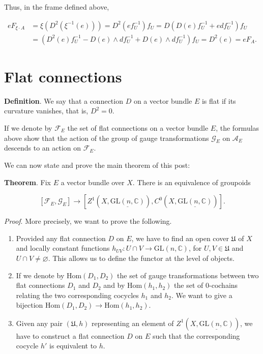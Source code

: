 \documentclass[]{article}
\begin{document}
Thus, in the frame defined above,

\begin{align*}
e F_{\xi \cdot A} &= \xi(D^2(\xi^{-1}(e))) = D^2(e f_U^{-1}) f_U = D(D(e) f_U^{-1} + e df_U^{-1}) f_U \\
&= (D^2(e) f_U^{-1} - D(e) \wedge df_U^{-1} + D(e) \wedge df_U^{-1} ) f_U =  D^2(e) = e F_A.
\end{align*}

\section{Flat connections}\label{flat-connections}

\textbf{Definition}. We say that a connection \(D\) on a vector bundle
\(E\) is flat if its curvature vanishes, that is, \(D^2=0\).

If we denote by \(\mathcal{F}_E\) the set of flat connections on a
vector bundle \(E\), the formulas above show that the action of the
group of gauge transformations \(\mathcal{G}_E\) on \(\mathcal{A}_E\)
descends to an action on \(\mathcal{F}_E\).

We can now state and prove the main theorem of this post:

\textbf{Theorem}. Fix \(E\) a vector bundle over \(X\). There is an
equivalence of groupoids

\[
[\mathcal{F}_E,\mathcal{G}_E] \longrightarrow [Z^1(X,\underline{\mathrm{GL}(n,\mathbb{C})}), C^0(X,\underline{\mathrm{GL}(n,\mathbb{C})})].
\]

\emph{Proof}. More precisely, we want to prove the following.

\begin{enumerate}
\def\labelenumi{\arabic{enumi}.}
\item
  Provided any flat connection \(D\) on \(E\), we have to find an open
  cover \(\mathfrak{U}\) of \(X\) and locally constant functions
  \(h_{UV}:U\cap V \rightarrow \mathrm{GL}(n,\mathbb{C})\), for
  \(U,V \in \mathfrak{U}\) and \(U\cap V \neq \varnothing\). This allows
  us to define the functor at the level of objects.
\item
  If we denote by \(\mathrm{Hom}(D_1,D_2)\) the set of gauge
  transformations between two flat connections \(D_1\) and \(D_2\) and
  by \(\mathrm{Hom}(h_1,h_2)\) the set of \(0\)-cochains relating the
  two corresponding cocycles \(h_1\) and \(h_2\). We want to give a
  bijection \(\mathrm{Hom}(D_1,D_2) \rightarrow \mathrm{Hom}(h_1,h_2)\).
\item
  Given any pair \((\mathfrak{U},h)\) representing an element of
  \(Z^1(X,\underline{\mathrm{GL}(n,\mathbb{C})})\), we have to construct
  a flat connection \(D\) on \(E\) such that the corresponding cocycle
  \(h'\) is equivalent to \(h\).
\end{enumerate}
\end{document}
